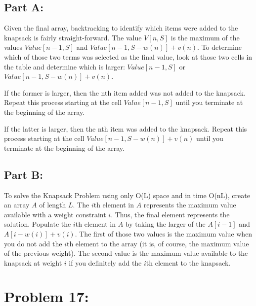 \documentclass[12pt]{article}
\begin{document}
\subsection{Part A:}

Given the final array, backtracking to identify which items were added to the knapsack is fairly straight-forward. The value $V[n, S]$ is the maximum of the values $Value[n-1, S]$ and $Value[n-1, S-w(n)] + v(n)$. To determine which of those two terms was selected as the final value, look at those two cells in the table and determine which is larger: $Value[n-1, S]$ or $Value[n-1, S-w(n)] + v(n)$. 

If the former is larger, then the nth item added was not added to the knapsack. Repeat this process starting at the cell $Value[n-1, S]$ until you terminate at the beginning of the array. 

If the latter is larger, then the nth item was added to the knapsack. Repeat this process starting at the cell $Value[n-1, S-w(n)] + v(n)$ until you terminate at the beginning of the array.

\subsection{Part B:}

To solve the Knapsack Problem using only O(L) space and in time O(nL), create an array $A$ of length $L$. The $i$th element in $A$ represents the maximum value available with a weight constraint $i$. Thus, the final element represents the solution. Populate the $i$th element in $A$ by taking the larger of the $A[i-1]$ and $A[i-w(i)] + v(i)$. The first of those two values is the maximum value when you do not add the $i$th element to the array (it is, of course, the maximum value of the previous weight). The second value is the maximum value available to the knapsack at weight $i$ if you definitely add the $i$th element to the knapsack.

\section*{Problem 17: }
\end{document}
